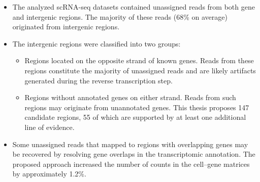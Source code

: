 \begin{itemize}
  \item The analyzed scRNA-seq datasets contained unassigned reads from both gene and intergenic regions.
  The majority of these reads (68\% on average) originated from intergenic regions.

  \item The intergenic regions were classified into two groups:
    \begin{itemize}
      \item Regions located on the opposite strand of known genes.
      Reads from these regions constitute the majority of unassigned reads and are likely artifacts generated during the reverse transcription step.
      
      \item Regions without annotated genes on either strand.
      Reads from such regions may originate from unannotated genes.
      This thesis proposes 147 candidate regions, 55 of which are supported by at least one additional line of evidence.
    \end{itemize}
  
  \item Some unassigned reads that mapped to regions with overlapping genes may be recovered
  by resolving gene overlaps in the transcriptomic annotation.
  The proposed approach increased the number of counts in the cell–gene matrices by approximately 1.2\%.
\end{itemize}
